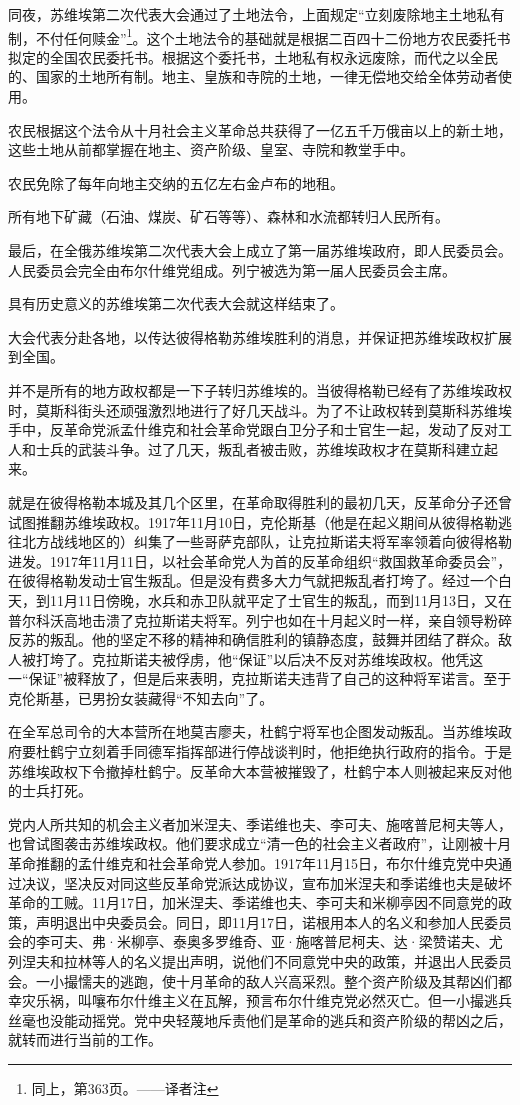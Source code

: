 同夜，苏维埃第二次代表大会通过了土地法令，上面规定“立刻废除地主土地私有制，不付任何赎金”\footnote{同上，第363页。——译者注}。这个土地法令的基础就是根据二百四十二份地方农民委托书拟定的全国农民委托书。根据这个委托书，土地私有权永远废除，而代之以全民的、国家的土地所有制。地主、皇族和寺院的土地，一律无偿地交给全体劳动者使用。

农民根据这个法令从十月社会主义革命总共获得了一亿五千万俄亩以上的新土地，这些土地从前都掌握在地主、资产阶级、皇室、寺院和教堂手中。

农民免除了每年向地主交纳的五亿左右金卢布的地租。

所有地下矿藏（石油、煤炭、矿石等等）、森林和水流都转归人民所有。

最后，在全俄苏维埃第二次代表大会上成立了第一届苏维埃政府，即人民委员会。人民委员会完全由布尔什维党组成。列宁被选为第一届人民委员会主席。

具有历史意义的苏维埃第二次代表大会就这样结束了。

大会代表分赴各地，以传达彼得格勒苏维埃胜利的消息，并保证把苏维埃政权扩展到全国。

并不是所有的地方政权都是一下子转归苏维埃的。当彼得格勒已经有了苏维埃政权时，莫斯科街头还顽强激烈地进行了好几天战斗。为了不让政权转到莫斯科苏维埃手中，反革命党派孟什维克和社会革命党跟白卫分子和士官生一起，发动了反对工人和士兵的武装斗争。过了几天，叛乱者被击败，苏维埃政权才在莫斯科建立起来。

就是在彼得格勒本城及其几个区里，在革命取得胜利的最初几天，反革命分子还曾试图推翻苏维埃政权。1917年11月10日，克伦斯基（他是在起义期间从彼得格勒逃往北方战线地区的）纠集了一些哥萨克部队，让克拉斯诺夫将军率领着向彼得格勒进发。1917年11月11日，以社会革命党人为首的反革命组织“救国救革命委员会”，在彼得格勒发动士官生叛乱。但是没有费多大力气就把叛乱者打垮了。经过一个白天，到11月11日傍晚，水兵和赤卫队就平定了士官生的叛乱，而到11月13日，又在普尔科沃高地击溃了克拉斯诺夫将军。列宁也如在十月起义时一样，亲自领导粉碎反苏的叛乱。他的坚定不移的精神和确信胜利的镇静态度，鼓舞并团结了群众。敌人被打垮了。克拉斯诺夫被俘虏，他“保证”以后决不反对苏维埃政权。他凭这一“保证”被释放了，但是后来表明，克拉斯诺夫违背了自己的这种将军诺言。至于克伦斯基，已男扮女装藏得“不知去向”了。

在全军总司令的大本营所在地莫吉廖夫，杜鹤宁将军也企图发动叛乱。当苏维埃政府要杜鹤宁立刻着手同德军指挥部进行停战谈判时，他拒绝执行政府的指令。于是苏维埃政权下令撤掉杜鹤宁。反革命大本营被摧毁了，杜鹤宁本人则被起来反对他的士兵打死。

党内人所共知的机会主义者加米涅夫、季诺维也夫、李可夫、施喀普尼柯夫等人，也曾试图袭击苏维埃政权。他们要求成立“清一色的社会主义者政府”，让刚被十月革命推翻的孟什维克和社会革命党人参加。1917年11月15日，布尔什维克党中央通过决议，坚决反对同这些反革命党派达成协议，宣布加米涅夫和季诺维也夫是破坏革命的工贼。11月17日，加米涅夫、季诺维也夫、李可夫和米柳亭因不同意党的政策，声明退出中央委员会。同日，即11月17日，诺根用本人的名义和参加人民委员会的李可夫、弗·米柳亭、泰奥多罗维奇、亚·施喀普尼柯夫、达·梁赞诺夫、尤列涅夫和拉林等人的名义提出声明，说他们不同意党中央的政策，并退出人民委员会。一小撮懦夫的逃跑，使十月革命的敌人兴高采烈。整个资产阶级及其帮凶们都幸灾乐祸，叫嚷布尔什维主义在瓦解，预言布尔什维克党必然灭亡。但一小撮逃兵丝毫也没能动摇党。党中央轻蔑地斥责他们是革命的逃兵和资产阶级的帮凶之后，就转而进行当前的工作。


